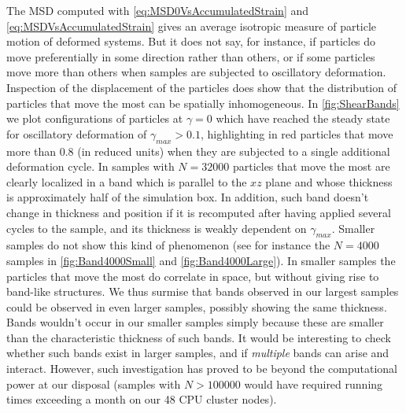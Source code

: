 The MSD computed with \autoref{eq:MSD0VsAccumulatedStrain} and \autoref{eq:MSDVsAccumulatedStrain} gives an average isotropic measure of particle motion of deformed systems. But it does not say, for instance, if particles do move preferentially in some direction rather than others, or if some particles move more than others when samples are subjected to oscillatory deformation. \\
Inspection of the displacement of the particles does show that the distribution of particles that move the most can be spatially inhomogeneous. In \autoref{fig:ShearBands} we plot configurations of particles at $\gamma = 0$ which have reached the steady state for oscillatory deformation of $\gamma_{max} > 0.1$, highlighting in red particles that move more than $0.8$ (in reduced units) when they are subjected to a single additional deformation cycle. In samples with $N=32000$ particles that move the most are clearly localized in a band which is parallel to the $xz$ plane and whose thickness is approximately half of the simulation box. In addition, such band doesn't change in thickness and position if it is recomputed after having applied several cycles to the sample, and its thickness is weakly dependent on $\gamma_{max}$.
Smaller samples do not show this kind of phenomenon (see for instance the $N=4000$ samples in \autoref{fig:Band4000Small} and \autoref{fig:Band4000Large}). In smaller samples the particles that move the most do correlate in space, but without giving rise to band-like structures. We thus surmise that bands observed in our largest samples could be observed in even larger samples, possibly showing the same thickness. Bands wouldn't occur in our smaller samples simply because these are smaller than the characteristic thickness of such bands. 
It would be interesting to check whether such bands exist in larger samples, and if \emph{multiple} bands can arise and interact. However, such investigation has proved to be beyond the computational power at our disposal (samples with $N > 100000$ would have required running times exceeding a month on our 48 CPU cluster nodes).


